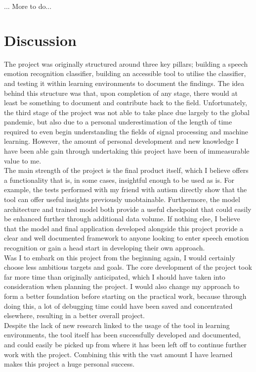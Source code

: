 \documentclass[12pt]{article}
\begin{document}
... More to do...
\newpage
\section{Discussion}
The project was originally structured around three key pillars; building a speech emotion recognition classifier, building an accessible tool to utilise the classifier, and testing it within learning environments to document the findings. The idea behind this structure was that, upon completion of any stage, there would at least be something to document and contribute back to the field. Unfortunately, the third stage of the project was not able to take place due largely to the global pandemic, but also due to a personal underestimation of the length of time required to even begin understanding the fields of signal processing and machine learning. However, the amount of personal development and new knowledge I have been able gain through undertaking this project have been of immeasurable value to me.
\\

\noindent The main strength of the project is the final product itself, which I believe offers a functionality that is, in some cases, insightful enough to be used as is. For example, the tests performed with my friend with autism directly show that the tool can offer useful insights previously unobtainable. Furthermore, the model architecture and trained model both provide a useful checkpoint that could easily be enhanced further through additional data volume. If nothing else, I believe that the model and final application developed alongside this project provide a clear and well documented framework to anyone looking to enter speech emotion recognition or gain a head start in developing their own approach. 
\\

\noindent Was I to embark on this project from the beginning again, I would certainly choose less ambitious targets and goals. The core development of the project took far more time than originally anticipated, which I should have taken into consideration when planning the project. I would also change my approach to form a better foundation before starting on the practical work, because through doing this, a lot of debugging time could have been saved and concentrated elsewhere, resulting in a better overall project. 
\\

\noindent Despite the lack of new research linked to the usage of the tool in learning environments, the tool itself has been successfully developed and documented, and could easily be picked up from where it has been left off to continue further work with the project. Combining this with the vast amount I have learned makes this project a huge personal success. 
\newpage
\end{document}
